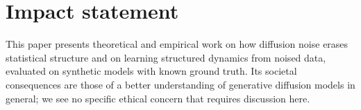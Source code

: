 \documentclass{article}
\theoremstyle{plain}
\theoremstyle{definition}
\theoremstyle{remark}
\begin{document}

\printAffiliationsAndNotice{}

\begin{abstract}

\end{abstract}













\section*{Impact statement}
This paper presents theoretical and empirical work on how diffusion noise erases
statistical structure and on learning structured dynamics from noised data, evaluated on
synthetic models with known ground truth. Its societal consequences are those of a better
understanding of generative diffusion models in general; we see no specific ethical
concern that requires discussion here.




\newpage
\appendix
\onecolumn






\end{document}
